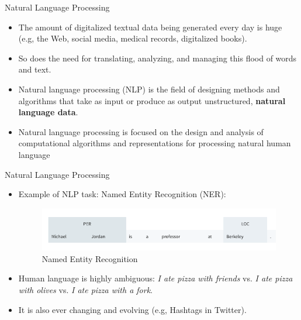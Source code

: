 \documentclass[handout]{beamer}
\begin{document}
\begin{frame}{Natural Language Processing}
\begin{scriptsize}
\begin{itemize}

\item The amount of digitalized textual data being generated every day is huge (e.g, the Web, social media, medical records, digitalized books).

\item So does the need for translating, analyzing, and managing this flood of words and text.

\item Natural language processing (NLP) is the field of designing methods and algorithms that take as input or produce as output unstructured, \textbf{natural language data}. \cite{goldberg2017neural}

\item Natural language processing is focused on the design and analysis of computational algorithms and representations for processing natural human language \cite{jacobbook}

\end{itemize}
\end{scriptsize}
\end{frame}



\begin{frame}{Natural Language Processing}
\begin{scriptsize}
\begin{itemize}
\item Example of NLP task: Named Entity Recognition (NER):


     \begin{figure}[h]
        	\includegraphics[scale = 0.4]{pics/NER.png}
        	\caption{Named Entity Recognition}
        \end{figure}

        
\item Human language is highly ambiguous: \emph{I ate pizza with friends} vs. \emph{I ate pizza with olives} vs. \emph{I ate pizza with a fork}.

\item It is also ever changing and evolving (e.g, Hashtags in Twitter). 

\end{itemize}
\end{scriptsize}
\end{frame}
\end{document}
